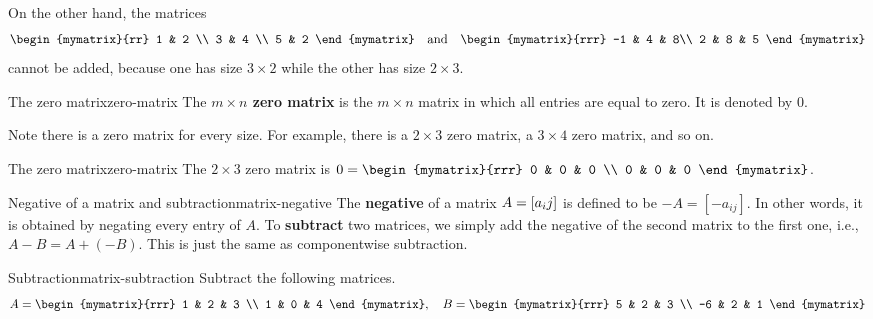 On the other hand, the matrices
\begin{equation*}
  \begin{mymatrix}{rr}
    1 & 2 \\
    3 & 4 \\
    5 & 2
  \end{mymatrix} 
  \quad\mbox{and}\quad
  \begin{mymatrix}{rrr}
    -1 & 4 & 8\\
    2 & 8 & 5
  \end{mymatrix} 
\end{equation*}
cannot be added, because one has size $3\times 2$ while the other has size $2\times 3$.

\begin{definition}{The zero matrix}{zero-matrix}
  The \textbf{$m\times n$ zero matrix}%
   is the $m\times n$ matrix in which all
  entries are equal to zero. It is denoted by $0$.
\end{definition}

Note there is a zero matrix for every size. For example, there is a
$2\times 3$ zero matrix, a $3\times 4$ zero matrix, and so on.

\begin{example}{The zero matrix}{zero-matrix}
  The $2\times 3$ zero matrix is $0= \begin{mymatrix}{rrr}
    0 & 0 & 0 \\
    0 & 0 & 0
  \end{mymatrix} $.
\end{example}

\begin{definition}{Negative of a matrix and subtraction}{matrix-negative}
  The \textbf{negative}%
   of a matrix $A=\left[a_ij\right]$ is defined
  to be $-A = [-a_{ij}]$. In other words, it is obtained by negating
  every entry of $A$. To \textbf{subtract}%
   two matrices, we simply add the
  negative of the second matrix to the first one, i.e., $A-B =
  A+(-B)$. This is just the same as componentwise subtraction.
\end{definition}

\begin{example}{Subtraction}{matrix-subtraction}
  Subtract the following matrices.
  \begin{equation*}
    A = \begin{mymatrix}{rrr}
      1 & 2 & 3 \\
      1 & 0 & 4
    \end{mymatrix},\quad
    B = \begin{mymatrix}{rrr}
      5 & 2 & 3 \\
      -6 & 2 & 1
    \end{mymatrix}
  \end{equation*}
\end{example}

